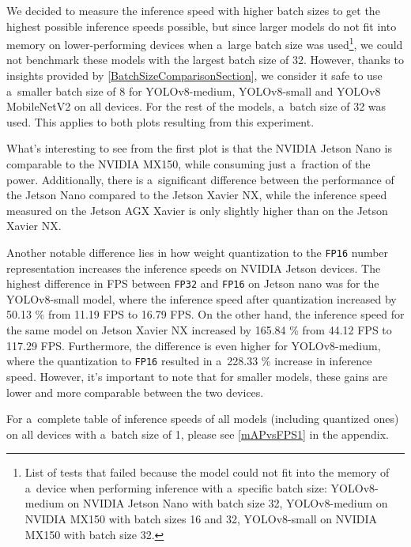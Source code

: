 We decided to measure the inference speed with higher batch sizes to get the
highest possible inference speeds possible, but since larger models do not fit
into memory on
lower-performing devices when a~large batch size was
used\footnote{List of tests that failed because the model could not fit into
the memory of a~device when performing inference with a~specific batch size:
YOLOv8-medium on NVIDIA Jetson Nano with batch size 32, YOLOv8-medium on NVIDIA
MX150 with batch sizes 16 and 32, YOLOv8-small on NVIDIA MX150 with batch size
32.}, we could not benchmark these models with the largest batch size of 32.
However, thanks to insights provided by \autoref{BatchSizeComparisonSection}, we
consider it safe to use a~smaller batch size of 8 for YOLOv8-medium,
YOLOv8-small and YOLOv8 MobileNetV2 on all devices. For the rest of the models,
a~batch size of 32 was used. This applies to both plots resulting from this
experiment.

What's interesting to see from the first plot is that the NVIDIA Jetson Nano is
comparable to the NVIDIA MX150, while consuming just a~fraction of the power.
Additionally, there is a~significant difference between the performance of the
Jetson Nano compared to the Jetson Xavier NX, while the inference speed measured
on the Jetson AGX Xavier is only slightly higher than on the Jetson Xavier NX.

Another notable difference lies in how weight quantization to the \texttt{FP16}
number representation increases the inference speeds on NVIDIA Jetson devices.
The highest difference in FPS between \texttt{FP32} and \texttt{FP16} on Jetson
nano was for the YOLOv8-small model, where the inference speed after
quantization increased by \num{50.13} \% from \num{11.19} FPS to \num{16.79}
FPS. On the other hand, the inference speed for the same model on Jetson Xavier
NX increased by \num{165.84} \% from \num{44.12} FPS to \num{117.29} FPS.
Furthermore, the difference is even higher for YOLOv8-medium, where the
quantization to \texttt{FP16} resulted in a~\num{228.33} \% increase in
inference speed. However, it's important to note that for smaller models, these
gains are lower and more comparable between the two devices.

For a~complete table of inference speeds of all models (including quantized
ones) on all devices with a~batch size of 1, please see \autoref{mAPvsFPS1} in
the appendix.

